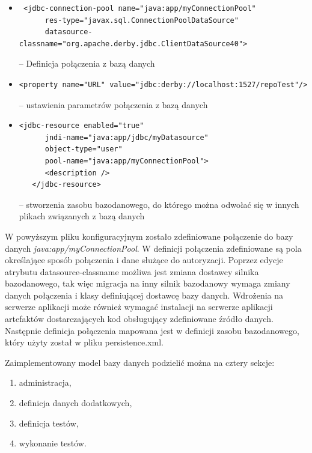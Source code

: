 \begin{itemize}
	\item  {\footnotesize \begin{verbatim} <jdbc-connection-pool name="java:app/myConnectionPool"
      res-type="javax.sql.ConnectionPoolDataSource"
      datasource-classname="org.apache.derby.jdbc.ClientDataSource40"> \end{verbatim}} -- Definicja połączenia z bazą danych
 	\item  {\footnotesize \begin{verbatim}<property name="URL" value="jdbc:derby://localhost:1527/repoTest"/>\end{verbatim}} -- ustawienia parametrów połączenia z bazą danych
 	
 	
 		\item  {\footnotesize \begin{verbatim}<jdbc-resource enabled="true"
      jndi-name="java:app/jdbc/myDatasource"
      object-type="user"
      pool-name="java:app/myConnectionPool">
      <description />
   </jdbc-resource>\end{verbatim}} -- stworzenia zasobu bazodanowego, do którego można odwołać się w innych plikach związanych z bazą danych
\end{itemize}

W powyższym pliku konfiguracyjnym zostało zdefiniowane połączenie do bazy danych \textit{java:app/myConnectionPool}. W definicji połączenia zdefiniowane są pola określające sposób połączenia i dane służące do autoryzacji. Poprzez edycje atrybutu datasource-classname możliwa jest zmiana dostawcy silnika bazodanowego, tak więc migracja na inny silnik bazodanowy wymaga zmiany danych połączenia i klasy definiującej dostawcę bazy danych. Wdrożenia na serwerze aplikacji może również wymagać instalacji na serwerze aplikacji artefaktów dostarczających kod obsługujący zdefiniowane źródło danych. Następnie definicja połączenia mapowana jest w definicji zasobu bazodanowego, który użyty został w pliku persistence.xml.

  Zaimplementowany model bazy danych podzielić można na cztery sekcje:
  \begin{enumerate}
    \item administracja,
    \item definicja danych dodatkowych,
    \item definicja testów,
    \item wykonanie testów.
  \end{enumerate}
  
